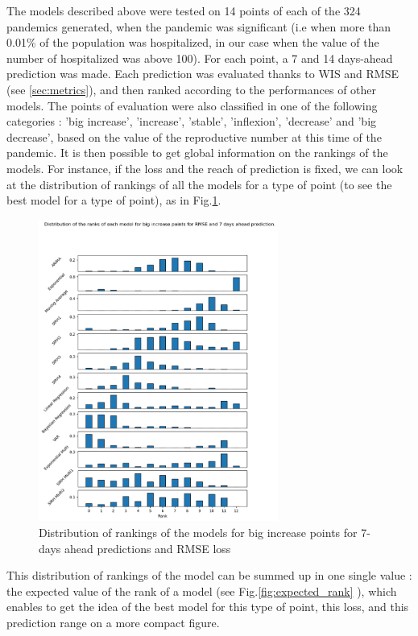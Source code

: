 The models described above were tested on 14 points of each of the 324 pandemics generated, when the pandemic was significant (i.e when more than 0.01\% of the population was hospitalized, in our case when the value of the number of hospitalized was above 100). 
For each point, a 7 and 14 days-ahead prediction was made. 
Each prediction was evaluated thanks to WIS and RMSE (see \ref{sec:metrics}), and then ranked according to the performances of other models.
The points of evaluation were also classified in one of the following categories : 'big increase', 'increase', 'stable', 'inflexion', 'decrease' and 'big decrease', based on the value of the reproductive number at this time of the pandemic. 
It is then possible to get global information on the rankings of the models. 
For instance, if the loss and the reach of prediction is fixed, we can look at the distribution of rankings of all the models for a type of point (to see the best model for a type of point), as in Fig.\ref{fig:rankings}.
\begin{figure}[h]
    \centering
    \includegraphics[width=0.7\textwidth]{figures/ranks_big_increase_RMSE_7.png}
    \caption{Distribution of rankings of the models for big increase points for 7-days ahead predictions and RMSE loss}
    \label{fig:rankings}
\end{figure}
This distribution of rankings of the model can be summed up in one single value : the expected value of the rank of a model (see Fig.\ref{fig:expected_rank} ), which enables to get the idea of the best model for this type of point, this loss, and this prediction range on a more compact figure. 

